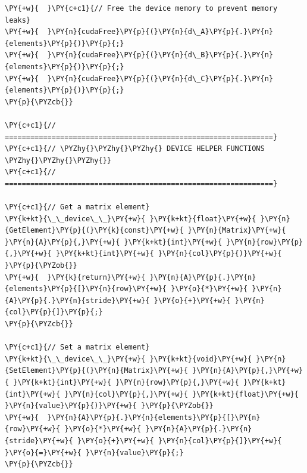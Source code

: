 \begin{Verbatim}[label=\makebox{\url{https://github.com/lucabaldini/cmepda/tree/master/slides/latex/snippets/MatrixMultiplication_shared.cu}},commandchars=\\\{\}]
\PY{+w}{  }\PY{c+c1}{// Free the device memory to prevent memory leaks}
\PY{+w}{  }\PY{n}{cudaFree}\PY{p}{(}\PY{n}{d\_A}\PY{p}{.}\PY{n}{elements}\PY{p}{)}\PY{p}{;}
\PY{+w}{  }\PY{n}{cudaFree}\PY{p}{(}\PY{n}{d\_B}\PY{p}{.}\PY{n}{elements}\PY{p}{)}\PY{p}{;}
\PY{+w}{  }\PY{n}{cudaFree}\PY{p}{(}\PY{n}{d\_C}\PY{p}{.}\PY{n}{elements}\PY{p}{)}\PY{p}{;}
\PY{p}{\PYZcb{}}

\PY{c+c1}{// ===============================================================}
\PY{c+c1}{// \PYZhy{}\PYZhy{}\PYZhy{} DEVICE HELPER FUNCTIONS \PYZhy{}\PYZhy{}\PYZhy{}}
\PY{c+c1}{// ===============================================================}

\PY{c+c1}{// Get a matrix element}
\PY{k+kt}{\_\_device\_\_}\PY{+w}{ }\PY{k+kt}{float}\PY{+w}{ }\PY{n}{GetElement}\PY{p}{(}\PY{k}{const}\PY{+w}{ }\PY{n}{Matrix}\PY{+w}{ }\PY{n}{A}\PY{p}{,}\PY{+w}{ }\PY{k+kt}{int}\PY{+w}{ }\PY{n}{row}\PY{p}{,}\PY{+w}{ }\PY{k+kt}{int}\PY{+w}{ }\PY{n}{col}\PY{p}{)}\PY{+w}{ }\PY{p}{\PYZob{}}
\PY{+w}{  }\PY{k}{return}\PY{+w}{ }\PY{n}{A}\PY{p}{.}\PY{n}{elements}\PY{p}{[}\PY{n}{row}\PY{+w}{ }\PY{o}{*}\PY{+w}{ }\PY{n}{A}\PY{p}{.}\PY{n}{stride}\PY{+w}{ }\PY{o}{+}\PY{+w}{ }\PY{n}{col}\PY{p}{]}\PY{p}{;}
\PY{p}{\PYZcb{}}

\PY{c+c1}{// Set a matrix element}
\PY{k+kt}{\_\_device\_\_}\PY{+w}{ }\PY{k+kt}{void}\PY{+w}{ }\PY{n}{SetElement}\PY{p}{(}\PY{n}{Matrix}\PY{+w}{ }\PY{n}{A}\PY{p}{,}\PY{+w}{ }\PY{k+kt}{int}\PY{+w}{ }\PY{n}{row}\PY{p}{,}\PY{+w}{ }\PY{k+kt}{int}\PY{+w}{ }\PY{n}{col}\PY{p}{,}\PY{+w}{ }\PY{k+kt}{float}\PY{+w}{ }\PY{n}{value}\PY{p}{)}\PY{+w}{ }\PY{p}{\PYZob{}}
\PY{+w}{  }\PY{n}{A}\PY{p}{.}\PY{n}{elements}\PY{p}{[}\PY{n}{row}\PY{+w}{ }\PY{o}{*}\PY{+w}{ }\PY{n}{A}\PY{p}{.}\PY{n}{stride}\PY{+w}{ }\PY{o}{+}\PY{+w}{ }\PY{n}{col}\PY{p}{]}\PY{+w}{ }\PY{o}{=}\PY{+w}{ }\PY{n}{value}\PY{p}{;}
\PY{p}{\PYZcb{}}


\end{Verbatim}
